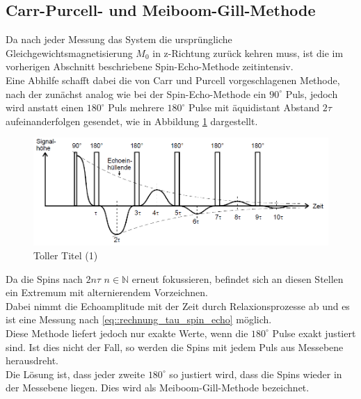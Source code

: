 \documentclass[]{scrartcl}
\begin{document}
\subsection{Carr-Purcell- und Meiboom-Gill-Methode}
Da nach jeder Messung das System die ursprüngliche Gleichgewichtsmagnetisierung $M_0$ in z-Richtung zurück kehren muss, ist die im vorherigen Abschnitt beschriebene Spin-Echo-Methode zeitintensiv.\\
Eine Abhilfe schafft dabei die von Carr und Purcell vorgeschlagenen Methode, nach der zunächst analog wie bei der Spin-Echo-Methode ein $90^\circ$ Puls, jedoch wird anstatt einen $180^\circ$ Puls mehrere $180^\circ$ Pulse mit äquidistant Abstand $2\tau$ aufeinanderfolgen gesendet, wie in Abbildung \ref{fig::Carr_Purcellt_signal} dargestellt.
\begin{figure}[H]
\centering
\includegraphics[width=14cm]{images/Carr_Purcellt_signal.png}
\caption{Toller Titel (1)}
\label{fig::Carr_Purcellt_signal}
\end{figure}
Da die Spins nach $2n\tau$ $n\in \mathbb{N}$ erneut fokussieren, befindet sich an diesen Stellen ein Extremum mit alternierendem Vorzeichnen.\\
Dabei nimmt die Echoamplitude mit der Zeit durch Relaxionsprozesse ab und es ist eine Messung nach \ref{eq::rechnung_tau_spin_echo} möglich.\\
Diese Methode liefert jedoch nur exakte Werte, wenn die $180^\circ$ Pulse exakt justiert sind. Ist dies nicht der Fall, so werden die Spins mit jedem Puls aus Messebene herausdreht.\\ Die Lösung ist, dass jeder zweite $180^\circ$ so justiert wird, dass die Spins wieder in der Messebene liegen. Dies wird als Meiboom-Gill-Methode bezeichnet.
\end{document}
